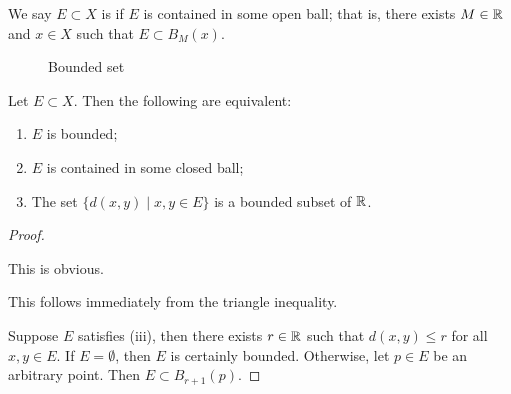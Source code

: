 \begin{definition}[Bounded]
We say $E\subset X$ is  if $E$ is contained in some open ball; that is, there exists $M\in\mathbb R$ and $x\in X$ such that $E\subset B_M(x)$.
\end{definition}

\begin{figure}[H]
\centering
{}
\caption{Bounded set}
\end{figure}

\begin{proposition}
Let $E\subset X$. Then the following are equivalent:
\begin{enumerate}[label=(\roman*)]
\item $E$ is bounded;
\item $E$ is contained in some closed ball;
\item The set $\{d(x,y)\mid x,y\in E\}$ is a bounded subset of $\mathbb R$.
\end{enumerate}
\end{proposition}

\begin{proof} \

 This is obvious.

 This follows immediately from the triangle inequality.

 Suppose $E$ satisfies (iii), then there exists $r\in\mathbb R$ such that $d(x,y)\le r$ for all $x,y\in E$. If $E=\emptyset$, then $E$ is certainly bounded. Otherwise, let $p\in E$ be an arbitrary point. Then $E\subset B_{r+1}(p)$.
\end{proof}


